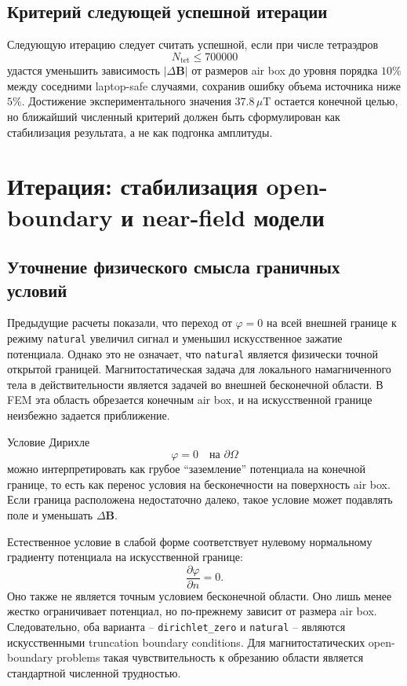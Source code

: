 \documentclass[12pt,a4paper]{article}
\begin{document}
\subsection*{Критерий следующей успешной итерации}

Следующую итерацию следует считать успешной, если при числе тетраэдров
\[
    N_{\mathrm{tet}} \le 700000
\]
удастся уменьшить зависимость \(|\Delta\mathbf B|\) от размеров air box до
уровня порядка \(10\%\) между соседними laptop-safe случаями, сохранив ошибку
объема источника ниже \(5\%\). Достижение экспериментального значения
\(37.8\,\mu\mathrm{T}\) остается конечной целью, но ближайший численный критерий
должен быть сформулирован как стабилизация результата, а не как подгонка
амплитуды.

\section{Итерация: стабилизация open-boundary и near-field модели}

\subsection*{Уточнение физического смысла граничных условий}

Предыдущие расчеты показали, что переход от \(\varphi=0\) на всей внешней
границе к режиму \texttt{natural} увеличил сигнал и уменьшил искусственное
зажатие потенциала. Однако это не означает, что \texttt{natural} является
физически точной открытой границей. Магнитостатическая задача для локального
намагниченного тела в действительности является задачей во внешней бесконечной
области. В FEM эта область обрезается конечным air box, и на искусственной
границе неизбежно задается приближение.

Условие Дирихле
\[
    \varphi = 0 \quad \text{на } \partial\Omega
\]
можно интерпретировать как грубое ``заземление'' потенциала на конечной границе,
то есть как перенос условия на бесконечности на поверхность air box. Если
граница расположена недостаточно далеко, такое условие может подавлять поле и
уменьшать \(\Delta\mathbf B\).

Естественное условие в слабой форме соответствует нулевому нормальному
градиенту потенциала на искусственной границе:
\[
    \frac{\partial\varphi}{\partial n}=0.
\]
Оно также не является точным условием бесконечной области. Оно лишь менее
жестко ограничивает потенциал, но по-прежнему зависит от размера air box.
Следовательно, оба варианта -- \texttt{dirichlet\_zero} и \texttt{natural} --
являются искусственными truncation boundary conditions. Для магнитостатических
open-boundary problems такая чувствительность к обрезанию области является
стандартной численной трудностью.
\end{document}
